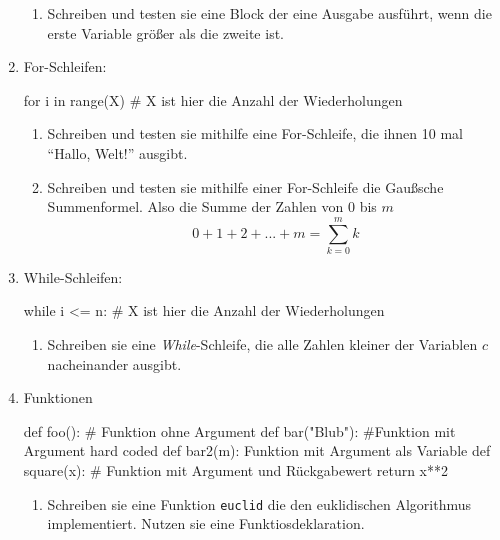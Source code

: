 \documentclass[paper=a4,fontsize=11pt]{scrartcl}%
\numberwithin{equation}{section}
\begin{document}
\begin{enumerate}
\begin{enumerate}
		\item Schreiben und testen sie eine Block der eine Ausgabe ausführt, wenn die erste Variable größer als die zweite ist.
	\end{enumerate}
	\item For-Schleifen:
\begin{python}
for i in range(X) # X ist hier die Anzahl der Wiederholungen
\end{python}
	\begin{enumerate}
		\item Schreiben und testen sie mithilfe eine For-Schleife, die ihnen 10 mal \enquote{Hallo, Welt!} ausgibt.
		\item Schreiben und testen sie mithilfe einer For-Schleife die Gaußsche Summenformel. Also die Summe der Zahlen von $0$ bis $m$
		$$ 0 + 1 + 2 + ... + m = \sum_{k=0}^m k$$
	\end{enumerate}
\item While-Schleifen:
\begin{python}
while i <= n: # X ist hier die Anzahl der Wiederholungen
\end{python}
	\begin{enumerate}
	\item Schreiben sie eine \emph{While}-Schleife, die alle Zahlen kleiner der Variablen $c$ nacheinander ausgibt.
	\end{enumerate}
	\item Funktionen
	\begin{python}
	def foo(): # Funktion ohne Argument
	def bar("Blub"): #Funktion mit Argument hard coded
	def bar2(m): Funktion mit Argument als Variable
	def square(x): # Funktion mit Argument und Rückgabewert
		return x**2
	\end{python}
\begin{enumerate}
	\item Schreiben sie eine Funktion \texttt{euclid} die den euklidischen Algorithmus implementiert. Nutzen sie eine Funktiosdeklaration.
\end{enumerate}
\end{enumerate}
\end{document}
